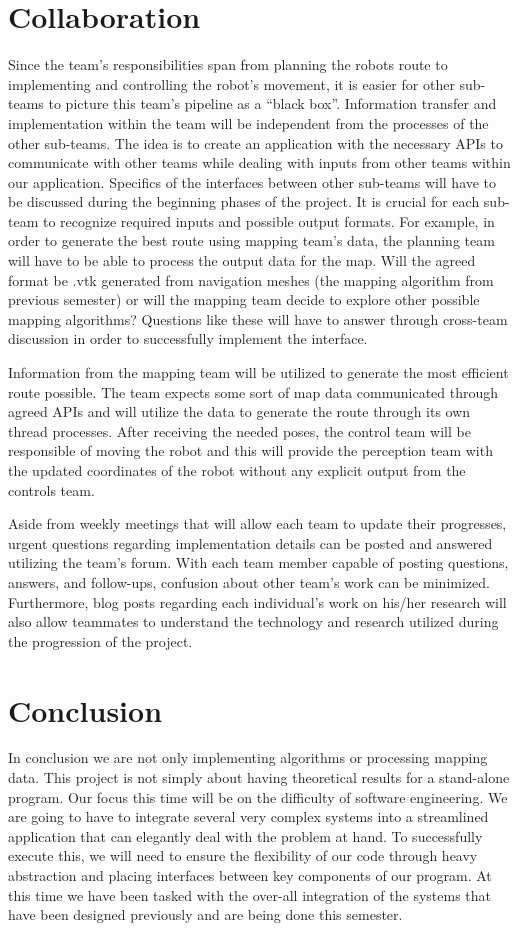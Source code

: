 \documentclass[titlepage]{article}
\begin{document}
\section{Collaboration}
Since the team’s responsibilities span from planning the robots route to implementing and controlling the robot’s movement, it is easier for other sub-teams to picture this team’s pipeline as a “black box”. Information transfer and implementation within the team will be independent from the processes of the other sub-teams. The idea is to create an application with the necessary APIs to communicate with other teams while dealing with inputs from other teams within our application. Specifics of the interfaces between other sub-teams will have to be discussed during the beginning phases of the project. It is crucial for each sub-team to recognize required inputs and possible output formats. For example, in order to generate the best route using mapping team’s data, the planning team will have to be able to process the output data for the map. Will the agreed format be .vtk generated from navigation meshes (the mapping algorithm from previous semester) or will the mapping team decide to explore other possible mapping algorithms? Questions like these will have to answer through cross-team discussion in order to successfully implement the interface.

Information from the mapping team will be utilized to generate the most efficient route possible. The team expects some sort of map data communicated through agreed APIs and will utilize the data to generate the route through its own thread processes. After receiving the needed poses, the control team will be responsible of moving the robot and this will provide the perception team with the updated coordinates of the robot without any explicit output from the controls team.   

Aside from weekly meetings that will allow each team to update their progresses, urgent questions regarding implementation details can be posted and answered utilizing the team’s forum. With each team member capable of posting questions, answers, and follow-ups, confusion about other team’s work can be minimized. Furthermore, blog posts regarding each individual’s work on his/her research will also allow teammates to understand the technology and research utilized during the progression of the project.
\section{Conclusion}
In conclusion we are not only implementing algorithms or processing mapping data. This project is not simply about having theoretical results for a stand-alone program. Our focus this time will be on the difficulty of software engineering. We are going to have to integrate several very complex systems into a streamlined application that can elegantly deal with the problem at hand. To successfully execute this, we will need to ensure the flexibility of our code through heavy abstraction and placing interfaces between key components of our program. At this time we have been tasked with the over-all integration of the systems that have been designed previously and are being done this semester. 
\end{document}
